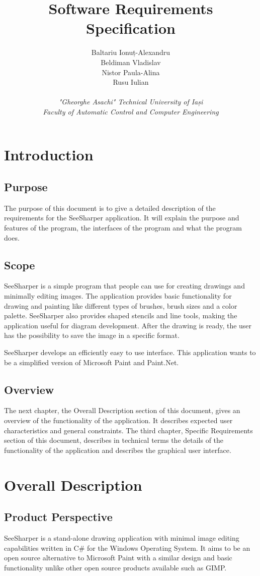 \documentclass{article}
\title{\textbf{Software Requirements Specification}}
\author
{
	Baltariu Ionuț-Alexandru
	\\
	Beldiman Vladislav
	\\
	Nistor Paula-Alina 
	\\
	Rusu Iulian
	\\
	\\
	\textit{"Gheorghe Asachi" Technical University of Iași}
	\\
	\textit{Faculty of Automatic Control and Computer Engineering}
}
\date{}
\begin{document}
\maketitle 

\newpage
\tableofcontents
\newpage

\section{Introduction}
\subsection{Purpose}
The purpose of this document is to give a detailed description of the requirements for the SeeSharper application.
It will explain the purpose and features of the program, the interfaces of the program and what the program does.

\subsection{Scope}
SeeSharper is a simple program that people can use for creating drawings and minimally editing images. The application provides basic functionality for drawing and painting like different types of brushes, brush sizes and a color palette. 
SeeSharper also provides shaped stencils and line tools, making the application useful for diagram development. After the drawing is ready, the user has the possibility to save the image in a specific format.

SeeSharper develops an efficiently easy to use interface. This application wants to be a simplified version of Microsoft Paint and Paint.Net.

\subsection{Overview}
The next chapter, the Overall Description section of this document, gives an overview of the functionality of the application. It describes expected user characteristics and general constraints. The third chapter, Specific Requirements section of this document, describes in technical terms the details of the functionality of the application and describes the graphical  user  interface.	

\section{Overall Description}
\subsection{Product Perspective}
SeeSharper is a stand-alone drawing application with minimal image editing capabilities written in C\# for the Windows Operating System. It aims to be an open source alternative to Microsoft Paint with a similar design and basic functionality unlike other open source products available such as GIMP.
\end{document}
